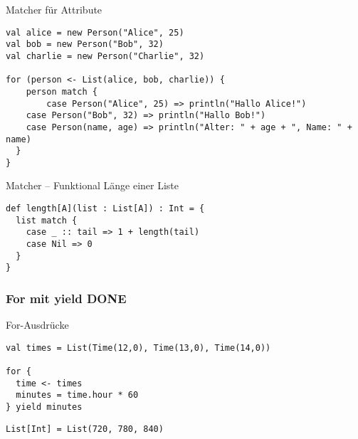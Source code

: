 \documentclass[14pt,aspectratio=169,trans]{beamer} %
\begin{document}
\begin{frame}[fragile]{}
 \begin{block}{Matcher für Attribute}
\scriptsize
	\onslide<2->
  \begin{lstlisting}
val alice = new Person("Alice", 25)
val bob = new Person("Bob", 32)
val charlie = new Person("Charlie", 32)
   
for (person <- List(alice, bob, charlie)) {
	person match {
		case Person("Alice", 25) => println("Hallo Alice!")
    case Person("Bob", 32) => println("Hallo Bob!")
    case Person(name, age) => println("Alter: " + age + ", Name: " + name)
  }
}
	\end{lstlisting}
\end{block}
\end{frame}

\begin{frame}[fragile]{}
 \begin{block}{Matcher -- Funktional Länge einer Liste}
\scriptsize
	\onslide<2->
  \begin{lstlisting}
def length[A](list : List[A]) : Int = {
  list match {
    case _ :: tail => 1 + length(tail)
    case Nil => 0
  }
}
	\end{lstlisting}
\end{block}
\end{frame}


\subsubsection*{For mit yield DONE}

\begin{frame}[fragile]{}
	\begin{block}{For-Ausdrücke}
		\scriptsize
		\onslide<2->
  \begin{lstlisting}
val times = List(Time(12,0), Time(13,0), Time(14,0))

for {
  time <- times
  minutes = time.hour * 60
} yield minutes
	\end{lstlisting}
  \begin{lstlisting}[firstnumber = 7]
List[Int] = List(720, 780, 840)
	\end{lstlisting}
	\end{block}
	\note{}
\end{frame}
\end{document}
